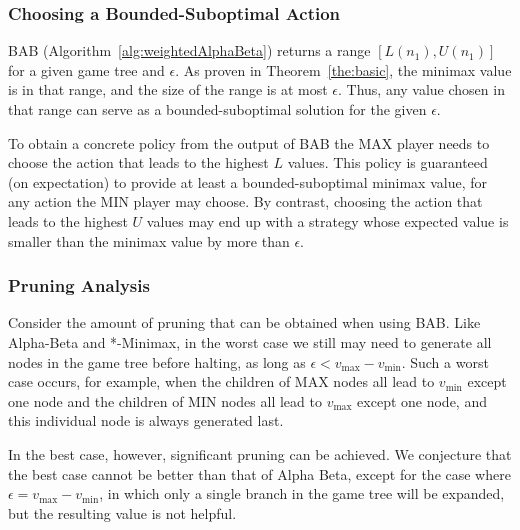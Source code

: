 \documentclass[runningheads]{llncs}
\newcommand{\pess}{\mathit{L}}
\newcommand{\opti}{\mathit{U}}
\newcommand{\vmax}{v_{\text{max}}}
\newcommand{\vmin}{v_{\text{min}}}
\newcommand{\rootnode}{\mathit{n_1}}
\begin{document}
\subsubsection{Choosing a Bounded-Suboptimal Action}
BAB (Algorithm~\ref{alg:weightedAlphaBeta}) returns a range $[\pess(\rootnode), \opti(\rootnode)]$ for a given game tree and $\epsilon$. As proven in Theorem~\ref{the:basic}, the minimax value is in that range, and the size of the range is at most $\epsilon$. Thus, any value chosen in that range can serve as a bounded-suboptimal solution for the given $\epsilon$. 

To obtain a concrete policy from the output of BAB the MAX player needs to choose the action that leads to the highest $\pess$ values. This policy is guaranteed (on expectation) to provide at least a bounded-suboptimal minimax value, for any action the MIN player may choose. By contrast, choosing the action that leads to the highest $\opti$ values may end up with a strategy whose expected value is smaller than the minimax value by more than $\epsilon$. %




\subsubsection{Pruning Analysis}


Consider the amount of pruning that can be obtained when using BAB. Like Alpha-Beta and *-Minimax, in the worst case we still may need to generate all nodes in the game tree before halting, as long as $\epsilon<\vmax-\vmin$. 
Such a worst case occurs, for example, when the children of MAX nodes all lead to $\vmin$ except one node
and the children of MIN nodes all lead to $\vmax$ except one node, and this individual node is always generated last. 

In the best case, however, significant pruning can be achieved.
We conjecture that the best case cannot be better than that of Alpha Beta, except for the case where $\epsilon=\vmax-\vmin$, in which only a single branch in the game tree will be expanded, but the resulting value is not helpful. 
\end{document}
